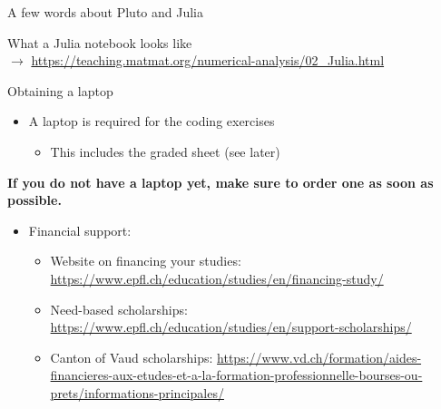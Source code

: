 \begin{frame}{A few words about Pluto and Julia}
    \begin{center}
        \Large{What a Julia notebook looks like} \\[3em]
        {\normalsize\smaller[3]
            \hspace{-1.8cm}
            \hspace{0.2cm}$\rightarrow$\hspace{0.2cm}
            \url{https://teaching.matmat.org/numerical-analysis/02_Julia.html}}
    \end{center}
\end{frame}

\begin{frame}{Obtaining a laptop}
    \begin{itemize}
        \item A laptop is required for the coding exercises
            \begin{itemize}
                \vspace{-0.3em}
                \item This includes the graded sheet (see later)
            \end{itemize}
        \end{itemize}
        \begin{block}{}
            \begin{center}
            \textbf{If you do not have a laptop yet, make sure to \linebreak
                order one as soon as possible.}
            \end{center}
        \end{block}

        \vspace{0.5em}

        \begin{itemize}
        \item \alert{Financial support}:
        \vspace{-0.3em}
        \begin{itemize}
            \item Website on financing your studies: \linebreak
                {\smaller
                \url{https://www.epfl.ch/education/studies/en/financing-study/}
            }
            \vspace{0.3em}
            \item Need-based scholarships: \linebreak
                {\smaller
                \url{https://www.epfl.ch/education/studies/en/support-scholarships/}}
            \vspace{-0.7em}
            \item Canton of Vaud scholarships:
                {\smaller \url{https://www.vd.ch/formation/aides-financieres-aux-etudes-et-a-la-formation-professionnelle-bourses-ou-prets/informations-principales/}}
        \end{itemize}
    \end{itemize}
\end{frame}


